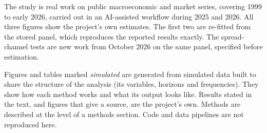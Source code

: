 \documentclass[
  british,
  a4paper,
]{article}
\begin{document}
The study is real work on public macroeconomic and market series,
covering 1999 to early 2026, carried out in an AI-assisted workflow
during 2025 and 2026. All three figures show the project's own
estimates. The first two are re-fitted from the stored panel, which
reproduces the reported results exactly. The spread-channel tests are
new work from October 2026 on the same panel, specified before
estimation.

Figures and tables marked \emph{simulated} are generated from simulated
data built to share the structure of the analysis (its variables,
horizons and frequencies). They show how each method works and what its
output looks like. Results stated in the text, and figures that give a
source, are the project's own. Methods are described at the level of a
methods section. Code and data pipelines are not reproduced here.
\end{document}
